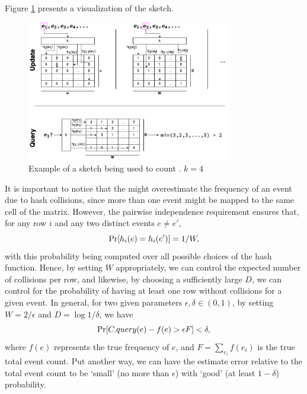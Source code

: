 

Figure \ref{fig:countminexample} presents a visualization of the \cm sketch.

\begin{figure}[htbp]
	\begin{center}
    \includegraphics[width=0.8\textwidth]{figures/cm-example}
	\end{center}
	\caption{Example of a \cm sketch being used to count \kmers. $k=4$}\label{fig:countminexample}
\end{figure}

It is important to notice that the \cm might overestimate the frequency of an event due to hash collisions, since more than one event might be mapped to the same cell of the matrix. However, the pairwise independence requirement ensures that, for any row $i$ and any two distinct events $e\neq e'$,
\begin{equation*}
\mathrm{Pr}[h_i(e)=h_i(e')] = 1/W,
\end{equation*}
with this probability being computed over all possible choices of the hash function.
Hence, by setting $W$ appropriately, we can control the expected number of collisions per row, and likewise, by choosing a sufficiently large $D$, we can control for the probability of having at least one row without collisions for a given event. In general, for two given parameters $\epsilon, \delta \in (0,1)$, by setting 
$W=2/\epsilon$ and $D=\log1/\delta$, we have
\begin{equation*}
\mathrm{Pr}[C.query(e) - f(e) > \epsilon F] < \delta,
\end{equation*}
where $f(e)$ represents the true frequency of $e$, and $F=\sum_{e_i}f(e_i)$ is the true total event count. Put another way, we can have the estimate error relative to the total event count to be `small' (no more than $\epsilon$) with `good' (at least $1-\delta$) probability.

